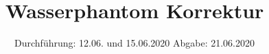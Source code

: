 

\subject{TPS Praktikum}
\title{Wasserphantom Korrektur}
\date{%
	Durchführung: 12.06. und 15.06.2020
	\hspace{3em}
	Abgabe: 21.06.2020
}



\maketitle
\thispagestyle{empty}
\tableofcontents
\newpage
\setlength{\parindent}{0em}





\newpage
\printbibliography{}
\nocite{*}



